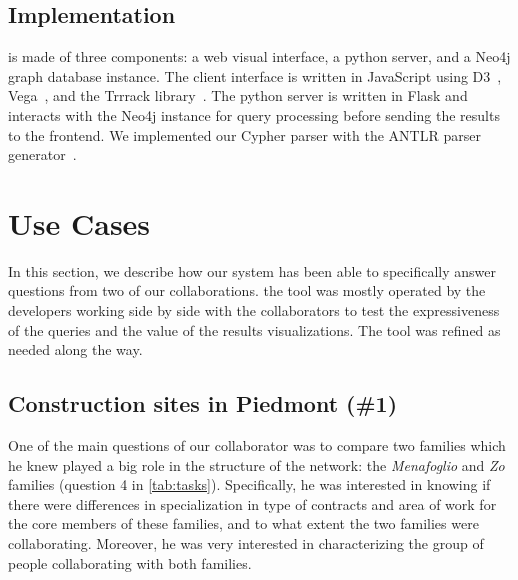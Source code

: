 \subsection{Implementation}

\name is made of three components: a web visual interface, a python server, and a Neo4j graph database instance.
The client interface is written in JavaScript using D3~\cite{d3}, Vega~\cite{satyanarayan2016vega}, and the Trrrack library~\cite{cutlerTrrackLibraryProvenanceTracking2020}.
The python server is written in Flask and interacts with the Neo4j instance for query processing before sending the results to the frontend.
We implemented our Cypher parser with the ANTLR parser generator~\cite{parr1995antlr}.


\section{Use Cases}\label{sec:usecases}

In this section, we describe  how our system has been able to specifically answer questions from two of our collaborations.
the tool was mostly operated by the developers working side by side with the collaborators to test the expressiveness of the queries and the value of the results visualizations.
The tool was refined as needed along the way.


\subsection{Construction sites in Piedmont (\#1)}

One of the main questions of our collaborator was to compare two families which he knew played a big role in the structure of the network: the \textit{Menafoglio} and \textit{Zo} families (question 4 in \autoref{tab:tasks}).
Specifically, he was interested in knowing if there were differences in specialization in type of contracts and area of work for the core members of these families, and to what extent the two families were collaborating.
Moreover, he was very interested in characterizing the group of people collaborating with both families.

